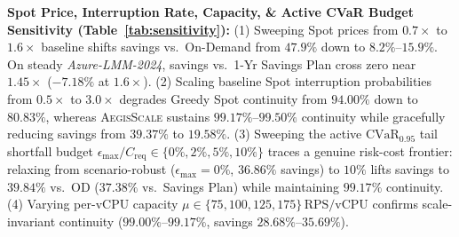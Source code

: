 \documentclass[journal]{IEEEtran}
\begin{document}
\begin{table}[t]
\centering
\caption{Experiment E: Empirical 2D Kubernetes/Karpenter Benchmark (Memory-Heavy Pod: $1\,\text{vCPU}, 7\,\text{GiB}$, 2024 Azure Trace)}
\label{tab:k8s2d}
\end{table}

\textbf{Spot Price, Interruption Rate, Capacity, \& Active CVaR Budget Sensitivity (Table~\ref{tab:sensitivity}):}
(1) Sweeping Spot prices from $0.7\times$ to $1.6\times$ baseline shifts savings vs.\ On-Demand from $47.9\%$ down to $8.2\%$--$15.9\%$. On steady \emph{Azure-LMM-2024}, savings vs.\ 1-Yr Savings Plan cross zero near $1.45\times$ ($-7.18\%$ at $1.6\times$).
(2) Scaling baseline Spot interruption probabilities from $0.5\times$ to $3.0\times$ degrades Greedy Spot continuity from $94.00\%$ down to $80.83\%$, whereas \textsc{AegisScale} sustains $99.17\%$--$99.50\%$ continuity while gracefully reducing savings from $39.37\%$ to $19.58\%$.
(3) Sweeping the active $\mathrm{CVaR}_{0.95}$ tail shortfall budget $\epsilon_{\max} / C_{\mathrm{req}} \in \{0\%, 2\%, 5\%, 10\%\}$ traces a genuine risk-cost frontier: relaxing from scenario-robust ($\epsilon_{\max}=0\%$, $36.86\%$ savings) to $10\%$ lifts savings to $39.84\%$ vs.\ OD ($37.38\%$ vs.\ Savings Plan) while maintaining $99.17\%$ continuity.
(4) Varying per-vCPU capacity $\mu \in \{75, 100, 125, 175\}\,\text{RPS/vCPU}$ confirms scale-invariant continuity ($99.00\%$--$99.17\%$, savings $28.68\%$--$35.69\%$).
\end{document}
